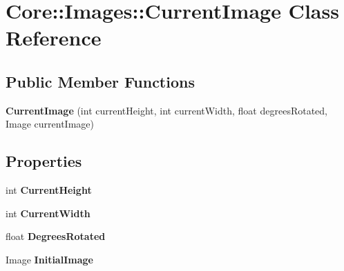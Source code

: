 \hypertarget{class_core_1_1_images_1_1_current_image}{
\section{Core::Images::CurrentImage Class Reference}
\label{class_core_1_1_images_1_1_current_image}
}
\subsection*{Public Member Functions}
\begin{DoxyCompactItemize}
\item 
\hypertarget{class_core_1_1_images_1_1_current_image_a3b70292134f4f1d3bcab09d95b7955d2}{
{\bfseries CurrentImage} (int currentHeight, int currentWidth, float degreesRotated, Image currentImage)}
\label{class_core_1_1_images_1_1_current_image_a3b70292134f4f1d3bcab09d95b7955d2}

\end{DoxyCompactItemize}
\subsection*{Properties}
\begin{DoxyCompactItemize}
\item 
\hypertarget{class_core_1_1_images_1_1_current_image_a2078708867df095c04d48aa209da5796}{
int {\bfseries CurrentHeight}}
\label{class_core_1_1_images_1_1_current_image_a2078708867df095c04d48aa209da5796}

\item 
\hypertarget{class_core_1_1_images_1_1_current_image_a1ab6e55c2dd0b4b6910fe50b94923213}{
int {\bfseries CurrentWidth}}
\label{class_core_1_1_images_1_1_current_image_a1ab6e55c2dd0b4b6910fe50b94923213}

\item 
\hypertarget{class_core_1_1_images_1_1_current_image_a05a03f38f6bd0742807676c348becab5}{
float {\bfseries DegreesRotated}}
\label{class_core_1_1_images_1_1_current_image_a05a03f38f6bd0742807676c348becab5}

\item 
\hypertarget{class_core_1_1_images_1_1_current_image_a81ade9bea1f77798b0484133ebcbcc2c}{
Image {\bfseries InitialImage}}
\label{class_core_1_1_images_1_1_current_image_a81ade9bea1f77798b0484133ebcbcc2c}

\end{DoxyCompactItemize}


